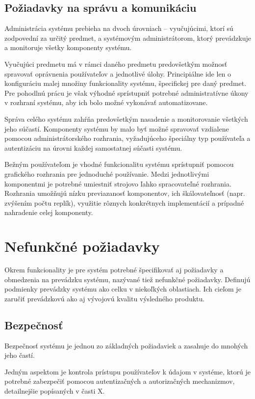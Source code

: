 \documentclass[
  digital, %
  twoside, %
  table,   %
  lof,     %
  lot,     %
]{fithesis3}
\begin{document}
\subsection{Požiadavky na správu a komunikáciu}

Administrácia systému prebieha na dvoch úrovniach -- vyučujúcimi, ktorí sú zodpovední za určitý predmet, a systémovým administrátorom, ktorý prevádzkuje a monitoruje všetky komponenty systému. 

Vyučujúci predmetu má v rámci daného predmetu predovšetkým možnosť spravovať oprávnenia používateľov a jednotlivé úlohy. Principiálne ide len o konfiguráciu malej množiny funkcionality systému, špecifickej pre daný predmet. Pre pohodlnú prácu je však výhodné sprístupniť potrebné administratívne úkony v rozhraní systému, aby ich bolo možné vykonávať automatizovane.

Správa celého systému zahŕňa predovšetkým nasadenie a monitorovanie všetkých jeho súčastí. Komponenty systému by malo byť možné spravovať vzdialene pomocou administrátorského rozhrania, vyžadujúceho špeciálny typ používateľa a autentizáciu na úrovni každej samostatnej súčasti systému.

Bežným používateľom je vhodné funkcionalitu systému sprístupniť pomocou grafického rozhrania pre jednoduché používanie. Medzi jednotlivými komponentmi je potrebné umiestniť strojovo ľahko spracovateľné rozhrania. Rozhrania umožňujú nízku previazanosť komponentov, ich škálovateľnosť (napr. zvýšením počtu replík), využitie rôznych konkrétnych implementácií a prípadné nahradenie celej komponenty.

\section{Nefunkčné požiadavky}

Okrem funkcionality je pre systém potrebné špecifikovať aj požiadavky a obmedzenia na prevádzku systému, nazývané tiež nefunkčné požiadavky. Definujú podmienky prevádzky systému ako celku v niekoľkých oblastiach. Ich cieľom je zaručiť prevádzkovú ako aj vývojovú kvalitu výsledného produktu.

\subsection{Bezpečnosť}
Bezpečnosť systému je jednou zo základných požiadaviek a zasahuje do mnohých jeho častí.

Jedným aspektom je kontrola prístupu používateľov k údajom v systéme, ktorú je potrebné zabezpečiť pomocou autentizačných a autorizačných mechanizmov, detailnejšie popísaných v časti X. %
\end{document}
